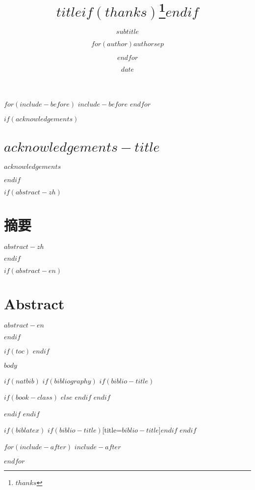 \documentclass[]{book}
\title{$title$$if(thanks)$\thanks{$thanks$}$endif$}
\subtitle{$subtitle$}
\author{$for(author)$$author$$sep$ \and $endfor$}
\institute{$for(institute)$$institute$$sep$ \and $endfor$}
\date{$date$}
\begin{document}
$for(include-before)$
$include-before$
$endfor$



\clearpage
{}

{}



$if(acknowledgements)$
\chapter*{$acknowledgements-title$}
$acknowledgements$
$endif$


$if(abstract-zh)$
\chapter*{摘要}
$abstract-zh$
$endif$

$if(abstract-en)$
\chapter*{Abstract}
$abstract-en$
$endif$


$if(toc)$
{
\setcounter{tocdepth}{$toc-depth$}
\tableofcontents
}
$endif$

\newpage

\listoftables
{}
{}
\newpage

\listoffigures
{}
{}
\newpage

\let\oldShaded=\Shaded
\let\endoldShaded=\endShaded
\renewenvironment{Shaded}{
  $if(linestretch-code)$
    \begin{spacing}{$linestretch-code$}\begin{oldShaded}
  $else$
    \begin{spacing}{1.2}\begin{oldShaded}
  $endif$
  }
  {
  \end{oldShaded}
  \end{spacing}
  }

\clearpage
{}

$body$




$if(natbib)$
  $if(bibliography)$
    $if(biblio-title)$

      $if(book-class)$
        \renewcommand\bibname{$biblio-title$}
      $else$
        \renewcommand\refname{$biblio-title$}
      $endif$
    $endif$
      
  $endif$
$endif$


$if(biblatex)$
  \printbibliography$if(biblio-title)$[title=$biblio-title$]$endif$
$endif$

$for(include-after)$
$include-after$

$endfor$
\end{document}
